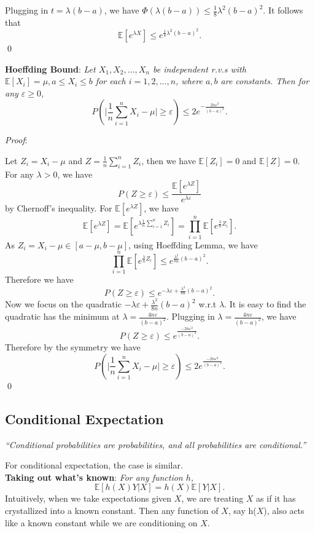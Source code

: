 \documentclass{progartcn}
\begin{document}
		Plugging in $t=\lambda(b-a)$, we have $\Phi(\lambda(b-a))\le \frac{1}{8}\lambda^2(b-a)^2$. It follows that
		\[\mathbb{E}[e^{\lambda X}]\le e^{\frac{1}{8}\lambda^2(b-a)^2}.\]
		\qed

		\textbf{Hoeffding Bound}: \textit{Let $X_1,X_2,...,X_n$ be independent r.v.s with $\mathbb{E}[X_i]=\mu,a\le X_i\le b$ for each $i=1,2,...,n$, where $a, b$ are constants. Then for any $\varepsilon\ge 0$,}
		\[P\left(\bigg\vert \frac{1}{n}\sum_{i=1}^n X_i-\mu\bigg\vert\ge \varepsilon\right)\le 2e^{-\frac{2n\varepsilon^2}{(b-a)^2}}.\]

		\textit{Proof}:

		Let $Z_i=X_i-\mu$ and $Z=\frac{1}{n}\sum_{i=1}^n Z_i$, then we have $\mathbb{E}[Z_i]=0$ and $\mathbb{E}[Z]=0$. For any $\lambda>0$, we have
		\[P(Z\ge \varepsilon)\le \frac{\mathbb{E}[e^{\lambda Z}]}{e^{\lambda \varepsilon}}\]
		by Chernoff's inequality. For $\mathbb{E}[e^{\lambda Z}]$, we have
		\[\mathbb{E}[e^{\lambda Z}]=\mathbb{E}[e^{\lambda \frac{1}{n}\sum_{i=1}^n Z_i}]=\prod_{i=1}^n \mathbb{E}[e^{\frac{\lambda}{n}Z_i}].\]
		As $Z_i=X_i-\mu \in [a-\mu,b-\mu]$, using Hoeffding Lemma, we have
		\[\prod_{i=1}^n \mathbb{E}[e^{\frac{\lambda}{n}Z_i}]\le e^{\frac{\lambda^2}{8n}(b-a)^2}.\]
		Therefore we have
		\[P(Z\ge\varepsilon)\le e^{-\lambda\varepsilon+\frac{\lambda^2}{8n}(b-a)^2}.\]
		Now we focus on the quadratic $-\lambda\varepsilon+\frac{\lambda^2}{8n}(b-a)^2$ w.r.t $\lambda$. It is easy to find the quadratic has the minimum at $\lambda=\frac{4n\varepsilon}{(b-a)^2}$. Plugging in $\lambda=\frac{4n\varepsilon}{(b-a)^2}$, we have
		\[P(Z\ge\varepsilon)\le e^{\frac{-2n\varepsilon^2}{(b-a)^2}}.\]
		Therefore by the symmetry we have
		\[P\left(\bigg\vert \frac{1}{n}\sum_{i=1}^n X_i-\mu\bigg\vert\ge \varepsilon\right)\le2e^{\frac{-2n\varepsilon^2}{(b-a)^2}}.\]
		\qed

	\subsection{Conditional Expectation}

		\textit{``Conditional probabilities are probabilities, and all probabilities are conditional.''}

		For conditional expectation, the case is similar.\\

		\textbf{Taking out what's known}: \textit{For any function $h$,}
		\[\mathbb{E}[h(X)Y|X]=h(X)\mathbb{E}[Y|X].\]
		Intuitively, when we take expectations given $X$, we are treating $X$ as if it has crystallized into a known constant. Then any function of $X$, say h($X$), also acts like a known constant while we are conditioning on $X$.\\
\end{document}

